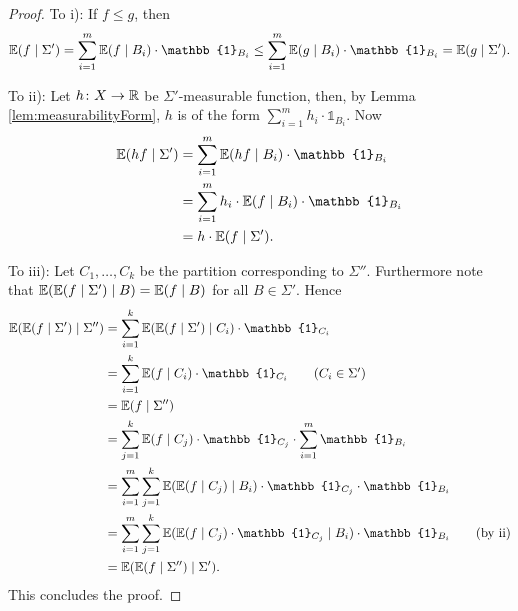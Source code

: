 \begin{proof}
To i): If $f\leq g$, then
\[\E(f\mid \Sigma')=\sum_{i=1}^m\E(f\mid B_i)\cdot \mathbb{1}_{B_i}\leq \sum_{i=1}^m\E(g\mid B_i)\cdot \mathbb{1}_{B_i}=\E(g\mid \Sigma').\]


To ii): Let $h\colon X\to\mathbb{R}$ be $\Sigma'$-measurable function, then, by Lemma \ref{lem:measurabilityForm}, $h$ is of the form $\sum_{i=1}^{m}h_i\cdot \mathbb{1}_{B_i}$. Now 
\begin{align*}
\E(h f\mid\Sigma')&=\sum_{i=1}^{m}\E(hf\mid B_i)\cdot\mathbb{1}_{B_i}\\
&=\sum_{i=1}^{m}h_i\cdot\E(f\mid B_i)\cdot\mathbb{1}_{B_i}\\
&=h\cdot\E(f\mid\Sigma').
\end{align*}

To iii): Let $C_1,\dots,C_k$ be the partition corresponding to $\Sigma''$. Furthermore note that $\mathbb{E}(\mathbb{E}(f\mid \Sigma')\mid B)=\mathbb{E}(f\mid B)$ for all $B\in\Sigma'$. Hence
\begin{align*}
\E(\E(f\mid \Sigma')\mid\Sigma'')&=\sum_{i=1}^{k}\E(\E(f\mid \Sigma')\mid C_i)\cdot\mathbb{1}_{C_i}\\
&=\sum_{i=1}^{k}\E(f\mid C_i)\cdot\mathbb{1}_{C_i}\tag{$C_i\in\Sigma'$}\\
&=\E(f\mid\Sigma'')\\
&=\sum_{j=1}^{k}\E(f\mid C_j)\cdot\mathbb{1}_{C_j}\cdot\sum_{i=1}^{m}\mathbb{1}_{B_i}\\
&=\sum_{i=1}^{m}\sum_{j=1}^{k}\E(\E(f\mid C_j)\mid B_i)\cdot\mathbb{1}_{C_j}\cdot\mathbb{1}_{B_i}\\
&=\sum_{i=1}^{m}\sum_{j=1}^{k}\E(\E(f\mid C_j)\cdot\mathbb{1}_{C_j}\mid B_i)\cdot\mathbb{1}_{B_i}\tag{by ii}\\
&=\E(\E(f\mid \Sigma'')\mid\Sigma').
\end{align*}
This concludes the proof.
\end{proof}



